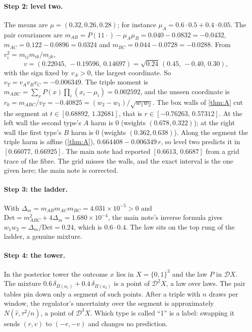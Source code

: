 \documentclass[11pt]{article}
\theoremstyle{definition}\newtheorem{definition}{Definition}\newtheorem{remark}{Remark}
\begin{document}
\paragraph{Step 2: level two.} The means are $\mu=(0.32,0.26,0.28)$; for instance $\mu_A=0.6\cdot0.5+0.4\cdot0.05$. The pair covariances
are $m_{AB}=P(11\cdot)-\mu_A\mu_B=0.040-0.0832=-0.0432$, $m_{AC}=0.122-0.0896=0.0324$ and $m_{BC}=0.044-0.0728=-0.0288$. From
$v_i^2=m_{ij}m_{ik}/m_{jk}$,
\[
v=(0.22045,\,-0.19596,\,0.14697)=\sqrt{0.24}\,(0.45,\,-0.40,\,0.30),
\]
with the sign fixed by $v_A>0$, the largest coordinate. So $v_T=v_Av_Bv_C=-0.006349$. The triple moment is $m_{ABC}=\sum_xP(x)\prod_i(x_i-\mu_i)=0.002592$,
and the unseen coordinate is $r_0=m_{ABC}/v_T=-0.40825=(w_2-w_1)/\sqrt{w_1w_2}$. The box walls of \cref{thm:A} cut the segment at
$t\in[0.68892,\,1.32681]$, that is $r\in[-0.76263,\,0.57312]$. At the left wall the second type's $A$ harm is $0$ (weights
$(0.678,0.322)$); at the right wall the first type's $B$ harm is $0$ (weights $(0.362,0.638)$). Along the segment the triple harm is
affine (\cref{thm:A}), $0.664408-0.006349\,r$, so level two predicts it in $[0.66077,\,0.66925]$. The main note had reported
$[0.6613,\,0.6687]$ from a grid trace of the fibre. The grid misses the walls, and the exact interval is the one given here; the main
note is corrected.

\paragraph{Step 3: the ladder.} With $\Delta_m=m_{AB}m_{AC}m_{BC}=4.031\times10^{-5}>0$ and $\mathrm{Det}=m_{ABC}^2+4\Delta_m=1.680\times10^{-4}$,
the main note's inverse formula gives $w_1w_2=\Delta_m/\mathrm{Det}=0.24$, which is $0.6\cdot0.4$. The law sits on the top rung of the
ladder, a genuine mixture.

\paragraph{Step 4: the tower.} In the posterior tower \cite{TowerGeometry} the outcome $x$ lies in $X=\{0,1\}^3$ and the law $P$ in
$\mathcal DX$. The mixture $0.6\,\delta_{\Pi(a_1)}+0.4\,\delta_{\Pi(a_2)}$ is a point of $\mathcal D^2X$, a law over laws. The pair tables
pin down only a segment of such points. After a triple with $n$ draws per window, the regulator's uncertainty over the segment is
approximately $N(\hat r,\tau^2/n)$, a point of $\mathcal D^3X$. Which type is called ``1'' is a label: swapping it sends $(r,v)$ to
$(-r,-v)$ and changes no prediction.
\end{document}
